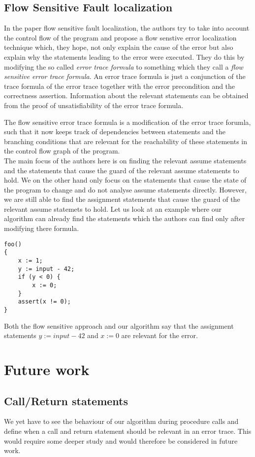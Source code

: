 \documentclass{article}
\begin{document}
\subsection{Flow Sensitive Fault localization} 
In the paper flow sensitive fault localization\cite{faultlocalization}, the authors try to take into account the control flow of the program and propose a flow senstive error localization technique which, they hope, not only explain the cause of the error but also explain why the statements leading to the error were executed. They do this by modifying the so called \textit{error trace formula} to something which they call a \textit{flow sensitive error trace formula}. An error trace formula is just a conjunction of the trace formula of the error trace together with the error precondition and the correctness assertion. Information about the relevant statements can be obtained from the proof of unsatisfiability of the error trace formula.

The flow sensitive error trace formula is a modification of the error trace forumla, such that it now keeps track of dependencies between statements and the branching conditions that are relevant for the reachability of these statements in the control flow graph of the program. \\
The main focus of the authors here is on finding the relevant assume statements and the statements that cause the guard of the relevant assume statements to hold. We on the other hand only focus on the statements that cause the state of the program to change and do not analyse assume statements directly. However, we are still able to find the assignment statements that cause the guard of the relevant assume statemets to hold. Let us look at an example where our algorithm can already find the statements which the authors can find only after modifying there formula. 
\begin{lstlisting}
foo()
{
	x := 1;
	y := input - 42;
	if (y < 0) {
		x := 0;	
	}
	assert(x != 0);
}
\end{lstlisting}
Both the flow sensitive approach and our algorithm say that the assignment statements $y := input - 42$ and $x := 0$ are relevant for the error.
\section{Future work}
\subsection{Call/Return statements}
We yet have to see the behaviour of our algorithm during procedure calls and define when a call and return statement should be relevant in an error trace. This would require some deeper study and would therefore be considered in future work.
\end{document}
